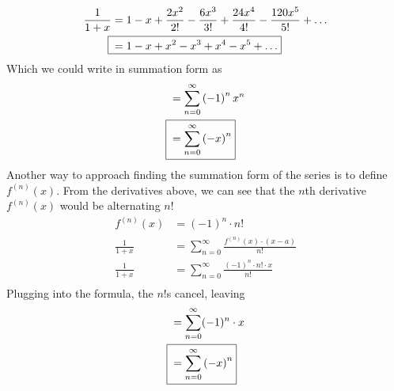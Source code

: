 \documentclass[12pt]{article}
\begin{document}
\begin{align}
  \frac{1}{1+x} & =1-x+\frac{2x^{2}}{2!}-\frac{6x^{3}}{3!}+\frac{24x^{4}}{4!}-\frac{120x^{5}}{5!}+\ldots \\
  \Aboxed{{}    & =1-x+x^{2}-x^{3}+x^{4}-x^{5}+\ldots}
\end{align}
Which we could write in summation form as
\begin{align}
             & =\sum_{n=0}^{\infty}\left(-1\right)^{n}x^{n} \\
  \Aboxed{{} & =\sum_{n=0}^{\infty}\left(-x\right)^{n}}
\end{align}
Another way to approach finding the summation form of the series is to define $f^{(n)}(x)$. From the derivatives above, we can see that the $n$th derivative $f^{(n)}(x)$ would be alternating $n!$
\begin{align}
  f^{\left(n\right)}\left(x\right) & =(-1)^n\cdot n!                                                                       \\
  \frac{1}{1+x}                    & = \sum_{n=0}^{\infty}\frac{f^{\left(n\right)}\left(x\right)\cdot\left(x-a\right)}{n!} \\
  \frac{1}{1+x}                    & = \sum_{n=0}^{\infty}\frac{(-1)^n\cdot n!\cdot x}{n!}                                 \\
\end{align}
Plugging into the formula, the $n!$s cancel, leaving
\begin{align}
             & = \sum_{n=0}^{\infty}(-1)^n\cdot x       \\
  \Aboxed{{} & =\sum_{n=0}^{\infty}\left(-x\right)^{n}}
\end{align}
\end{document}
